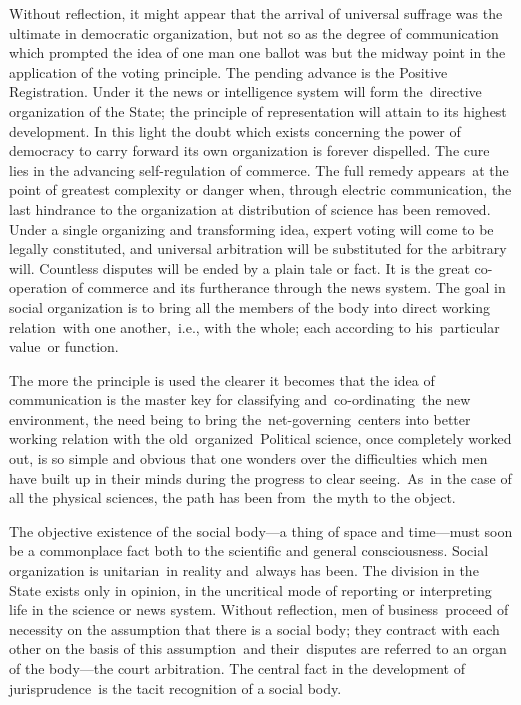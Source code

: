 \documentclass[openany,nobib]{tufte-book}
\begin{document}
Without reflection, it might appear that the arrival of universal
suffrage was the ultimate in democratic organization, but not so as the
degree of communication which prompted the idea of one man one ballot
was but the midway point in the application of the voting principle. The
pending advance is the Positive Registration. Under it the news or
intelligence system will form the~directive organization of the State;
the principle of representation will attain to its highest development.
In this light the doubt which exists concerning the power of democracy
to carry forward its own organization is forever dispelled. The cure
lies in the advancing self-regulation of commerce. The full remedy
appears~at the point of greatest complexity or danger when, through
electric communication, the last hindrance to the organization at
distribution of science has been removed. Under a single organizing and
transforming idea, expert voting will come to be legally constituted,
and universal arbitration will be substituted for the arbitrary will.
Countless disputes will be ended by a plain tale or fact. It is the
great co-operation of commerce and its furtherance through the news
system. The goal in social organization is to bring all the members of
the body into direct working relation~with one another,~i.e., with the
whole; each according to his~particular value~or function.~

The more the principle is used the clearer it becomes that the idea of
communication is the master key for classifying and~co-ordinating~the
new environment, the need being to bring the~net-governing~centers into
better working relation with the old~organized~Political science, once
completely worked out, is so simple and obvious that one wonders over
the difficulties which men have built up in their minds during the
progress to clear seeing.~As~in the case of all the physical sciences,
the path has been from~the myth to the object.~~

The objective existence of the social body---a thing of space and
time---must soon be a commonplace fact both to the scientific and
general consciousness. Social organization is unitarian~in reality
and~always has been. The division in the State exists only in opinion,
in the uncritical mode of reporting or interpreting life in the science
or news system. Without reflection, men of business~proceed of necessity
on the assumption that there is a social body; they contract with each
other on the basis of this assumption~and their~disputes are referred to
an organ of the body---the court arbitration. The central fact in the
development of jurisprudence~is the tacit recognition of a social body.
~
\end{document}
